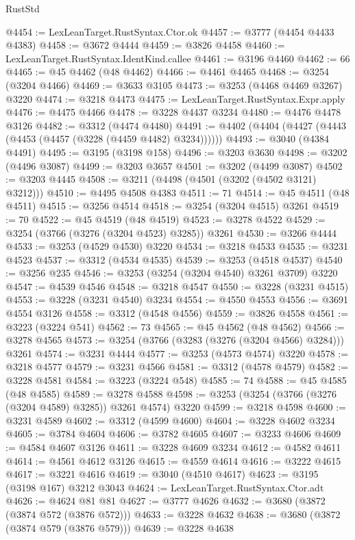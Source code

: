 \begin{lexlean}{RustStd}
\begin{coremodule}
@4454 := LexLeanTarget.RustSyntax.Ctor.ok
@4457 := @3777 (@4454 @4433 @4383)
@4458 := @3672 @4444
@4459 := @3826 @4458
@4460 := LexLeanTarget.RustSyntax.IdentKind.callee
@4461 := @3196 @4460
@4462 := 66
@4465 := @45 @4462 (@48 @4462)
@4466 := @4461 @4465
@4468 := @3254 (@3204 @4466)
@4469 := @3633 @3105
@4473 := @3253 (@4468 @4469 @3267) @3220
@4474 := @3218 @4473
@4475 := LexLeanTarget.RustSyntax.Expr.apply
@4476 := @4475 @4466
@4478 := @3228 @4437 @3234
@4480 := @4476 @4478 @3126
@4482 := @3312 (@4474 @4480)
@4491 := @4402 (@4404 (@4427 (@4443 (@4453 (@4457 (@3228 (@4459 @4482) @3234))))))
@4493 := @3040 (@4384 @4491)
@4495 := @3195 (@3198 @158)
@4496 := @3203 @3630
@4498 := @3202 (@4496 @3087)
@4499 := @3203 @3657
@4501 := @3202 (@4499 @3087)
@4502 := @3203 @4445
@4508 := @3211 (@4498 (@4501 (@3202 (@4502 @3121) @3212)))
@4510 := @4495 @4508 @4383
@4511 := 71
@4514 := @45 @4511 (@48 @4511)
@4515 := @3256 @4514
@4518 := @3254 (@3204 @4515) @3261
@4519 := 70
@4522 := @45 @4519 (@48 @4519)
@4523 := @3278 @4522
@4529 := @3254 (@3766 (@3276 (@3204 @4523) @3285)) @3261
@4530 := @3266 @4444
@4533 := @3253 (@4529 @4530) @3220
@4534 := @3218 @4533
@4535 := @3231 @4523
@4537 := @3312 (@4534 @4535)
@4539 := @3253 (@4518 @4537)
@4540 := @3256 @235
@4546 := @3253 (@3254 (@3204 @4540) @3261 @3709) @3220
@4547 := @4539 @4546
@4548 := @3218 @4547
@4550 := @3228 (@3231 @4515)
@4553 := @3228 (@3231 @4540) @3234
@4554 := @4550 @4553
@4556 := @3691 @4554 @3126
@4558 := @3312 (@4548 @4556)
@4559 := @3826 @4558
@4561 := @3223 (@3224 @541)
@4562 := 73
@4565 := @45 @4562 (@48 @4562)
@4566 := @3278 @4565
@4573 := @3254 (@3766 (@3283 (@3276 (@3204 @4566) @3284))) @3261
@4574 := @3231 @4444
@4577 := @3253 (@4573 @4574) @3220
@4578 := @3218 @4577
@4579 := @3231 @4566
@4581 := @3312 (@4578 @4579)
@4582 := @3228 @4581
@4584 := @3223 (@3224 @548)
@4585 := 74
@4588 := @45 @4585 (@48 @4585)
@4589 := @3278 @4588
@4598 := @3253 (@3254 (@3766 (@3276 (@3204 @4589) @3285)) @3261 @4574) @3220
@4599 := @3218 @4598
@4600 := @3231 @4589
@4602 := @3312 (@4599 @4600)
@4604 := @3228 @4602 @3234
@4605 := @3784 @4604
@4606 := @3782 @4605
@4607 := @3233 @4606
@4609 := @4584 @4607 @3126
@4611 := @3228 @4609 @3234
@4612 := @4582 @4611
@4614 := @4561 @4612 @3126
@4615 := @4559 @4614
@4616 := @3222 @4615
@4617 := @3221 @4616
@4619 := @3040 (@4510 @4617)
@4623 := @3195 (@3198 @167) @3212 @3043
@4624 := LexLeanTarget.RustSyntax.Ctor.adt
@4626 := @4624 @81 @81
@4627 := @3777 @4626
@4632 := @3680 (@3872 (@3874 @572 (@3876 @572)))
@4633 := @3228 @4632
@4638 := @3680 (@3872 (@3874 @579 (@3876 @579)))
@4639 := @3228 @4638

\end{coremodule}
\end{lexlean}

